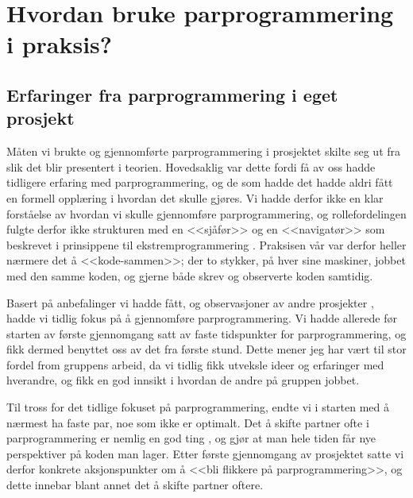 \section{Hvordan bruke parprogrammering i praksis?}

\subsection{Erfaringer fra parprogrammering i eget prosjekt}

Måten vi brukte og gjennomførte parprogrammering i prosjektet skilte seg ut fra slik det blir presentert i teorien. 
Hovedsaklig var dette fordi få av oss hadde tidligere erfaring med parprogrammering, og de som hadde det hadde aldri fått en formell opplæring i hvordan det skulle gjøres.
Vi hadde derfor ikke en klar forståelse av hvordan vi skulle gjennomføre parprogrammering, og rollefordelingen fulgte derfor ikke strukturen med en <<sjåfør>> og en <<navigatør>> som beskrevet i prinsippene til ekstremprogrammering \cite{kniberg2015}.
Praksisen vår var derfor heller nærmere det å <<kode-sammen>>; der to stykker, på hver sine maskiner, jobbet med den samme koden, og gjerne både skrev og observerte koden samtidig.

Basert på anbefalinger vi hadde fått, og observasjoner av andre prosjekter \cite{kniberg2015}, hadde vi tidlig fokus på å gjennomføre parprogrammering.
Vi hadde allerede før starten av første gjennomgang satt av faste tidspunkter for parprogrammering, og fikk dermed benyttet oss av det fra første stund.
Dette mener jeg har vært til stor fordel from gruppens arbeid, da vi tidlig fikk utveksle ideer og erfaringer med hverandre, og fikk en god innsikt i hvordan de andre på gruppen jobbet.

Til tross for det tidlige fokuset på parprogrammering, endte vi i starten med å nærmest ha faste par, noe som ikke er optimalt.
Det å skifte partner ofte i parprogrammering er nemlig en god ting \cite{kniberg2015}, og gjør at man hele tiden får nye perspektiver på koden man lager.
Etter første gjennomgang av prosjektet satte vi derfor konkrete aksjonspunkter om å <<bli flikkere på parprogrammering>>, og dette innebar blant annet det å skifte partner oftere.

